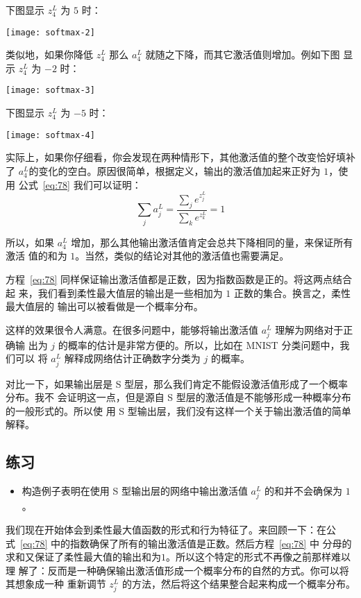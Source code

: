 下图显示 $z^L_4$ 为 $5$ 时：
\begin{center}
  \texttt{[image: softmax-2]}
\end{center}

类似地，如果你降低 $z^L_4$ 那么 $a^L_4$ 就随之下降，而其它激活值则增加。例如下图
显示 $z^L_4$ 为 $-2$ 时：
\begin{center}
  \texttt{[image: softmax-3]}
\end{center}

下图显示 $z^L_4$ 为 $-5$ 时：
\begin{center}
  \texttt{[image: softmax-4]}
\end{center}

实际上，如果你仔细看，你会发现在两种情形下，其他激活值的整个改变恰好填补
了 $a^L_4$的变化的空白。原因很简单，根据定义，输出的激活值加起来正好为 $1$，使用
公式~\eqref{eq:78} 我们可以证明：
\begin{equation}
  \sum_j a^L_j = \frac{\sum_j e^{z^L_j}}{\sum_k e^{z^L_k}} = 1
  \label{eq:79}\tag{79}
\end{equation}

所以，如果 $a^L_4$ 增加，那么其他输出激活值肯定会总共下降相同的量，来保证所有激活
值的和为 $1$。当然，类似的结论对其他的激活值也需要满足。

方程~\eqref{eq:78} 同样保证输出激活值都是正数，因为指数函数是正的。将这两点结合起
来，我们看到柔性最大值层的输出是一些相加为 $1$ 正数的集合。换言之，柔性最大值层的
输出可以被看做是一个概率分布。

这样的效果很令人满意。在很多问题中，能够将输出激活值 $a^L_j$ 理解为网络对于正确输
出为 $j$ 的概率的估计是非常方便的。所以，比如在 MNIST 分类问题中，我们可以
将 $a^L_j$ 解释成网络估计正确数字分类为 $j$ 的概率。

对比一下，如果输出层是 S 型层，那么我们肯定不能假设激活值形成了一个概率分布。我不
会证明这一点，但是源自 S 型层的激活值是不能够形成一种概率分布的一般形式的。所以使
用 S 型输出层，我们没有这样一个关于输出激活值的简单解释。

\subsection*{练习}

\begin{itemize}
\item 构造例子表明在使用 S 型输出层的网络中输出激活值 $a^L_j$ 的和并不会确保为
  $1$。
\end{itemize}

我们现在开始体会到柔性最大值函数的形式和行为特征了。来回顾一下：在公
式~\eqref{eq:78} 中的指数确保了所有的输出激活值是正数。然后方程~\eqref{eq:78} 中
分母的求和又保证了柔性最大值的输出和为$1$。所以这个特定的形式不再像之前那样难以理
解了：反而是一种确保输出激活值形成一个概率分布的自然的方式。你可以将其想象成一种
重新调节 $z^L_j$ 的方法，然后将这个结果整合起来构成一个概率分布。


